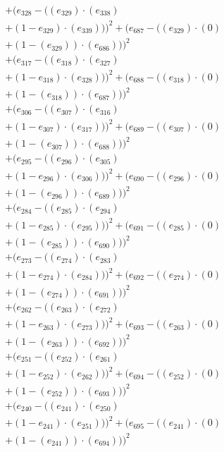 \documentclass[10pt, a4paper]{article}
\begin{document}
\begin{align*}
& + (e_{328} - ((e_{329})  \cdot  (e_{338}) \\
& + (1 - e_{329})  \cdot  (e_{339})))^{2} + (e_{687} - ((e_{329}) \cdot (0) \\
& + (1 - (e_{329})) \cdot (e_{686})))^{2} \\
& + (e_{317} - ((e_{318})  \cdot  (e_{327}) \\
& + (1 - e_{318})  \cdot  (e_{328})))^{2} + (e_{688} - ((e_{318}) \cdot (0) \\
& + (1 - (e_{318})) \cdot (e_{687})))^{2} \\
& + (e_{306} - ((e_{307})  \cdot  (e_{316}) \\
& + (1 - e_{307})  \cdot  (e_{317})))^{2} + (e_{689} - ((e_{307}) \cdot (0) \\
& + (1 - (e_{307})) \cdot (e_{688})))^{2} \\
& + (e_{295} - ((e_{296})  \cdot  (e_{305}) \\
& + (1 - e_{296})  \cdot  (e_{306})))^{2} + (e_{690} - ((e_{296}) \cdot (0) \\
& + (1 - (e_{296})) \cdot (e_{689})))^{2} \\
& + (e_{284} - ((e_{285})  \cdot  (e_{294}) \\
& + (1 - e_{285})  \cdot  (e_{295})))^{2} + (e_{691} - ((e_{285}) \cdot (0) \\
& + (1 - (e_{285})) \cdot (e_{690})))^{2} \\
& + (e_{273} - ((e_{274})  \cdot  (e_{283}) \\
& + (1 - e_{274})  \cdot  (e_{284})))^{2} + (e_{692} - ((e_{274}) \cdot (0) \\
& + (1 - (e_{274})) \cdot (e_{691})))^{2} \\
& + (e_{262} - ((e_{263})  \cdot  (e_{272}) \\
& + (1 - e_{263})  \cdot  (e_{273})))^{2} + (e_{693} - ((e_{263}) \cdot (0) \\
& + (1 - (e_{263})) \cdot (e_{692})))^{2} \\
& + (e_{251} - ((e_{252})  \cdot  (e_{261}) \\
& + (1 - e_{252})  \cdot  (e_{262})))^{2} + (e_{694} - ((e_{252}) \cdot (0) \\
& + (1 - (e_{252})) \cdot (e_{693})))^{2} \\
& + (e_{240} - ((e_{241})  \cdot  (e_{250}) \\
& + (1 - e_{241})  \cdot  (e_{251})))^{2} + (e_{695} - ((e_{241}) \cdot (0) \\
& + (1 - (e_{241})) \cdot (e_{694})))^{2} \\

\end{align*}
\end{document}
